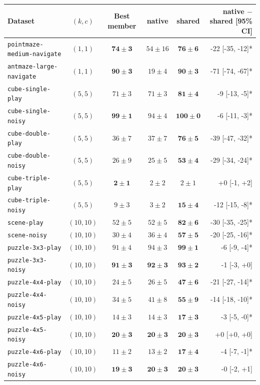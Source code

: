 \begin{tabular}{lcccc r}
\toprule
Dataset & $(k,c)$ & Best member & \wmpa{} native & \wmpa{} shared & native $-$ shared [95\% CI] \\
\midrule
\texttt{pointmaze-medium-navigate} & $(1,1)$ & $\mathbf{74 \pm 3}$ & $54 \pm 16$ & $\mathbf{76 \pm 6}$ & -22 [-35, -12]* \\
\texttt{antmaze-large-navigate} & $(1,1)$ & $\mathbf{90 \pm 3}$ & $19 \pm 4$ & $\mathbf{90 \pm 3}$ & -71 [-74, -67]* \\
\texttt{cube-single-play} & $(5,5)$ & $71 \pm 3$ & $71 \pm 3$ & $\mathbf{81 \pm 4}$ & -9 [-13, -5]* \\
\texttt{cube-single-noisy} & $(5,5)$ & $\mathbf{99 \pm 1}$ & $94 \pm 4$ & $\mathbf{100 \pm 0}$ & -6 [-11, -3]* \\
\texttt{cube-double-play} & $(5,5)$ & $36 \pm 7$ & $37 \pm 7$ & $\mathbf{76 \pm 5}$ & -39 [-47, -32]* \\
\texttt{cube-double-noisy} & $(5,5)$ & $26 \pm 9$ & $25 \pm 5$ & $\mathbf{53 \pm 4}$ & -29 [-34, -24]* \\
\texttt{cube-triple-play} & $(5,5)$ & $\mathbf{2 \pm 1}$ & $2 \pm 2$ & $2 \pm 1$ & +0 [-1, +2] \\
\texttt{cube-triple-noisy} & $(5,5)$ & $9 \pm 3$ & $3 \pm 2$ & $\mathbf{15 \pm 4}$ & -12 [-15, -8]* \\
\texttt{scene-play} & $(10,10)$ & $52 \pm 5$ & $52 \pm 5$ & $\mathbf{82 \pm 6}$ & -30 [-35, -25]* \\
\texttt{scene-noisy} & $(10,10)$ & $30 \pm 4$ & $36 \pm 4$ & $\mathbf{57 \pm 5}$ & -20 [-25, -16]* \\
\texttt{puzzle-3x3-play} & $(10,10)$ & $91 \pm 4$ & $94 \pm 3$ & $\mathbf{99 \pm 1}$ & -6 [-9, -4]* \\
\texttt{puzzle-3x3-noisy} & $(10,10)$ & $\mathbf{91 \pm 3}$ & $\mathbf{92 \pm 3}$ & $\mathbf{93 \pm 2}$ & -1 [-3, +0] \\
\texttt{puzzle-4x4-play} & $(10,10)$ & $24 \pm 5$ & $26 \pm 5$ & $\mathbf{47 \pm 6}$ & -21 [-27, -14]* \\
\texttt{puzzle-4x4-noisy} & $(10,10)$ & $34 \pm 5$ & $41 \pm 8$ & $\mathbf{55 \pm 9}$ & -14 [-18, -10]* \\
\texttt{puzzle-4x5-play} & $(10,10)$ & $14 \pm 3$ & $14 \pm 3$ & $\mathbf{17 \pm 3}$ & -3 [-5, -0]* \\
\texttt{puzzle-4x5-noisy} & $(10,10)$ & $\mathbf{20 \pm 3}$ & $\mathbf{20 \pm 3}$ & $\mathbf{20 \pm 3}$ & +0 [+0, +0] \\
\texttt{puzzle-4x6-play} & $(10,10)$ & $11 \pm 2$ & $13 \pm 2$ & $\mathbf{17 \pm 4}$ & -4 [-7, -1]* \\
\texttt{puzzle-4x6-noisy} & $(10,10)$ & $\mathbf{19 \pm 3}$ & $\mathbf{20 \pm 3}$ & $\mathbf{20 \pm 3}$ & -0 [-2, +1] \\
\bottomrule
\end{tabular}
